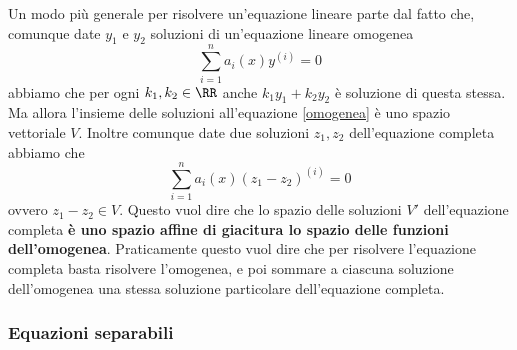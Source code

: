 \documentclass[11pt]{scrartcl}
\begin{document}
	Un modo più generale per risolvere un'equazione lineare parte dal fatto che, comunque date $y_1$ e $y_2$ soluzioni di un'equazione lineare omogenea
	\begin{equation}
		\label{omogenea}
		\sum_{i=1}^n a_i(x)y^{(i)}=0
	\end{equation}
	abbiamo che per ogni $k_1,k_2\in\RR$ anche $k_1y_1+k_2y_2$ è soluzione di questa stessa. Ma allora l'insieme delle soluzioni all'equazione \ref{omogenea} è uno spazio vettoriale $V$. Inoltre comunque date due soluzioni $z_1,z_2$ dell'equazione completa abbiamo che
	$$\sum_{i=1}^n a_i(x)(z_1-z_2)^{(i)}=0$$
	ovvero $z_1-z_2\in V$. Questo vuol dire che lo spazio delle soluzioni $V'$ dell'equazione completa \textbf{è uno spazio affine di giacitura lo spazio delle funzioni dell'omogenea}. Praticamente questo vuol dire che per risolvere l'equazione completa basta risolvere l'omogenea, e poi sommare a ciascuna soluzione dell'omogenea una stessa soluzione particolare dell'equazione completa.
	
	\subsubsection{Equazioni separabili}
	
\end{document}
